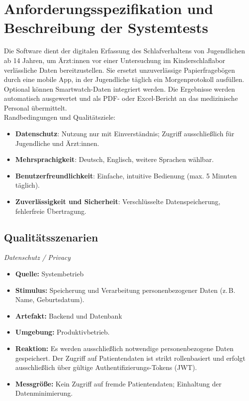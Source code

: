 \section{Anforderungsspezifikation und Beschreibung der Systemtests}

Die Software dient der digitalen Erfassung des Schlafverhaltens von Jugendlichen ab 14 Jahren, um Ärzt:innen vor einer Untersuchung im Kinderschlaflabor verlässliche Daten bereitzustellen.
Sie ersetzt unzuverlässige Papierfragebögen durch eine mobile App, in der Jugendliche täglich ein Morgenprotokoll ausfüllen. Optional können Smartwatch-Daten integriert werden.
Die Ergebnisse werden automatisch ausgewertet und als PDF- oder Excel-Bericht an das medizinische Personal übermittelt. \\
Randbedingungen und Qualitätsziele:
\begin{itemize}
	\item \textbf{Datenschutz}: Nutzung nur mit Einverständnis; Zugriff ausschließlich für Jugendliche und Ärzt:innen.
	\item \textbf{Mehrsprachigkeit}: Deutsch, Englisch, weitere Sprachen wählbar.
	\item \textbf{Benutzerfreundlichkeit}: Einfache, intuitive Bedienung (max. 5 Minuten täglich).
	\item \textbf{Zuverlässigkeit und Sicherheit}: Verschlüsselte Datenspeicherung, fehlerfreie Übertragung.
\end{itemize}

\subsection{Qualitätsszenarien}

\textit{Datenschutz / Privacy}
\begin{itemize}
  \item[] \textbf{Quelle:} Systembetrieb
  \item[] \textbf{Stimulus:} Speicherung und Verarbeitung personenbezogener Daten (z.\,B. Name, Geburtsdatum).
  \item[] \textbf{Artefakt:} Backend und Datenbank
  \item[] \textbf{Umgebung:} Produktivbetrieb.
  \item[] \textbf{Reaktion:} Es werden ausschließlich notwendige personenbezogene Daten gespeichert. Der Zugriff auf Patientendaten ist strikt rollenbasiert und erfolgt ausschließlich über gültige Authentifizierungs-Tokens (JWT).
  \item[] \textbf{Messgröße:} Kein Zugriff auf fremde Patientendaten; Einhaltung der Datenminimierung.
\end{itemize}

